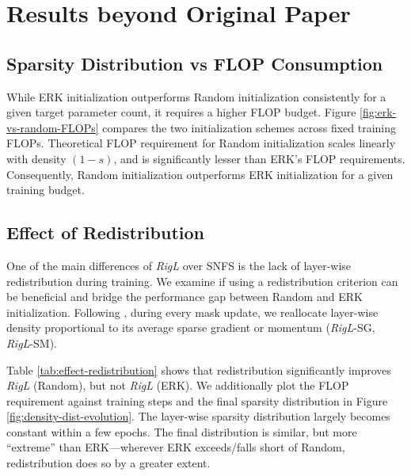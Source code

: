 \section{Results beyond Original Paper}
 
\subsection{Sparsity Distribution vs FLOP Consumption}\label{effect-sparsity-distribution}



While ERK initialization outperforms Random initialization consistently for a given target parameter count, it requires a higher FLOP budget. Figure \ref{fig:erk-vs-random-FLOPs} compares the two initialization schemes across fixed training FLOPs. Theoretical FLOP requirement for Random initialization scales linearly with density $(1-s)$, and is significantly lesser than ERK's FLOP requirements. Consequently, Random initialization outperforms ERK initialization for a given training budget.

\subsection{Effect of Redistribution}\label{effect-redistribution}



One of the main differences of \textit{RigL} over SNFS is the lack of layer-wise redistribution during training. We examine if using a redistribution criterion can be beneficial and bridge the performance gap between Random and ERK initialization. Following \citet{dettmers2020sparse}, during every mask update, we reallocate layer-wise density proportional to its average sparse gradient or momentum (\textit{RigL}-SG, \textit{RigL}-SM).
 
Table \ref{tab:effect-redistribution} shows that redistribution significantly improves \textit{RigL} (Random), but not \textit{RigL} (ERK). We additionally plot the FLOP requirement against training steps and the final sparsity distribution in Figure \ref{fig:density-dist-evolution}. The layer-wise sparsity distribution largely becomes constant within a few epochs. The final distribution is similar, but more ``extreme'' than ERK---wherever ERK exceeds/falls short of Random, redistribution does so by a greater extent.

